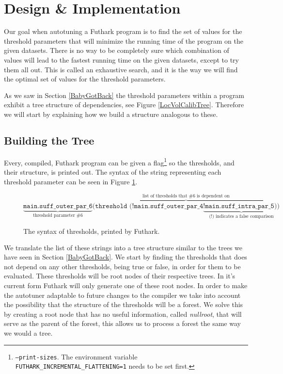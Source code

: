 \section{Design \& Implementation}
\label{imp}
Our goal when autotuning a Futhark program is to find the set of values for the
threshold parameters that will minimize the running time of the program on the
given datasets. There is no way to be completely sure
which combination of values will lead to the fastest running time on the given
datasets, except to try them all out. This is called an exhaustive search, and
it is the way we will find the optimal set of values for the threshold
parameters. 

As we saw in Section \ref{BabyGotBack} the threshold parameters within a
program exhibit a tree structure of dependencies, see Figure \ref{LocVolCalibTree}.
Therefore we will start by explaining how we build a structure analogous to these.
%
\subsection{Building the Tree}
Every, compiled, Futhark program can be given a
flag\footnote{\texttt{--print-sizes}. The environment variable
\texttt{FUTHARK\_INCREMENTAL\_FLATTENING=1} needs to be set first.} so the
thresholds, and their structure, is printed out. The syntax of the string
representing each threshold parameter can be seen in Figure
\ref{thresholdSyntax}.
\begin{figure}[h]
	$$\underbrace{\texttt{main.suff\_outer\_par\_6}}_\text{threshold parameter \#6} \overbrace{\texttt{(threshold (!main.suff\_outer\_par\_4} \underbrace{\texttt{!main.suff\_intra\_par\_5))}}_\text{(!) indicates a false comparison}}^\text{list of thresholds that \#6 is dependent on}$$
	\caption{The syntax of thresholds, printed by Futhark.}
	\label{thresholdSyntax}
\end{figure}
We translate the list of these strings into a tree structure similar to the
trees we have seen in Section \ref{BabyGotBack}. 
We start by finding the thresholds that does not depend on any other thresholds, 
being true or false, in order for them to be evaluated.
These thresholds will be root nodes of their respective trees.
In it's current form Futhark will only generate one of these root nodes. In
order to make the autotuner adaptable to future changes to the compiler we take
into account the possibility that the structure of the thresholds will be a
forest. We solve this by creating a root node that has no useful information,
called \textit{nullroot}, that will serve as the parent of the forest, this
allows us to process a forest the same way we would a tree.

